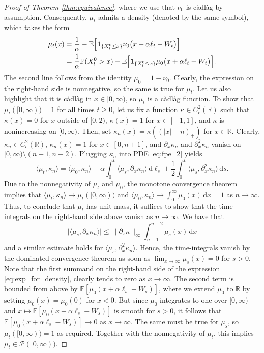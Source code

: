 \documentclass[11pt, a4paper]{article}
\theoremstyle{plain}
\theoremstyle{definition}
\theoremstyle{remark}
\numberwithin{equation}{section}
\newcommand{\ev}{\mathbb{E}}
\newcommand{\pr}{\mathbb{P}}
\newcommand{\R}{\mathbb{R}}
\renewcommand{\P}{\mathcal{P}}
\renewcommand{\d}{\mathrm{d}}
\renewcommand{\bf}[1]{\mathbf{#1}}
\begin{document}
\begin{proof}[Proof of Theorem \ref{thm:equivalence}]
where we use that $\nu_0$ is c\`adl\`ag by assumption. Consequently, $\mu_t$ admits a density (denoted by the same symbol), which takes the form
\begin{align} \label{eq:exp_for_density}
    \mu_t(x) &= \frac{1}{\alpha} - \ev\Bigl[\bf{1}_{\{X^0_t \leq x\}}\nu_0\bigl(x + \alpha \ell_t - W_t\bigr) \Bigr] \notag \\
    &= \frac{1}{\alpha} \pr(X^0_t > x) + \ev\Bigl[\bf{1}_{\{X^0_t \leq x\}}\mu_0\bigl(x + \alpha \ell_t - W_t\bigr) \Bigr].
\end{align}
The second line follows from the identity $\mu_0 = 1 - \nu_0$. Clearly, the expression on the right-hand side is nonnegative, so the same is true for $\mu_t$. Let us also highlight that it is c\`adl\`ag in $x \in [0, \infty)$, so $\mu_t$ is a c\`adl\`ag function. To show that $\mu_t([0, \infty)) = 1$ for all times $t \geq 0$, let us fix a function $\kappa \in C_c^2(\R)$ such that $\kappa(x) = 0$ for $x$ outside of $[0, 2)$, $\kappa(x) = 1$ for $x \in [-1, 1]$, and $\kappa$ is nonincreasing on $[0, \infty)$. Then, set $\kappa_n(x) = \kappa((\lvert x\rvert - n)_+)$ for $x \in \R$. Clearly, $\kappa_n \in C_c^2(\R)$, $\kappa_n(x) = 1$ for $x \in [0, n + 1]$, and $\partial_x \kappa_n$ and $\partial_x^2 \kappa_n$ vanish on $[0, \infty) \setminus (n + 1, n + 2)$. Plugging $\kappa_n$ into PDE \eqref{eq:fpe_2} yields
\begin{equation*}
    \langle \mu_t, \kappa_n\rangle = \langle \mu_0, \kappa_n\rangle - \alpha \int_0^t \langle \mu_s, \partial_x \kappa_n\rangle \, \d \ell_s + \frac{1}{2} \int_0^t \langle \mu_s, \partial_x^2 \kappa_n\rangle \, \d s.
\end{equation*}
Due to the nonnegativity of $\mu_t$ and $\mu_0$, the monotone convergence theorem implies that $\langle \mu_t, \kappa_n\rangle \to \mu_t([0, \infty))$ and $\langle \mu_0, \kappa_n\rangle \to \int_0^{\infty} \mu_0(x) \, \d x = 1$ as $n \to \infty$. Thus, to conclude that $\mu_t$ has unit mass, it suffices to show that the time-integrals on the right-hand side above vanish as $n \to \infty$. We have that
\begin{equation*}
    \lvert \langle \mu_s, \partial_x \kappa_n\rangle\rvert \leq \lVert \partial_x \kappa\rVert_{\infty} \int_{n + 1}^{n + 2} \mu_s(x) \, \d x
\end{equation*}
and a similar estimate holds for $\langle \mu_s, \partial_x^2 \kappa_n\rangle$. Hence, the time-integrals vanish by the dominated convergence theorem as soon as $\lim_{x \to \infty} \mu_s(x) = 0$ for $s > 0$. Note that the first summand on the right-hand side of the expression \eqref{eq:exp_for_density}, clearly tends to zero as $x \to \infty$. The second term is bounded from above by $\ev[\mu_0(x + \alpha \ell_s - W_s)]$, where we extend $\mu_0$ to $\R$ by setting $\mu_0(x) = \mu_0(0)$ for $x < 0$. But since $\mu_0$ integrates to one over $[0, \infty)$ and $x \mapsto \ev[\mu_0(x + \alpha \ell_s - W_s)]$ is smooth for $s > 0$, it follows that $\ev[\mu_0(x + \alpha \ell_s - W_s)] \to 0$ as $x \to \infty$. The same must be true for $\mu_s$, so $\mu_t([0, \infty)) = 1$ as required. Together with the nonnegativity of $\mu_t$, this implies $\mu_t \in \P([0, \infty))$.


\end{proof}
\end{document}
